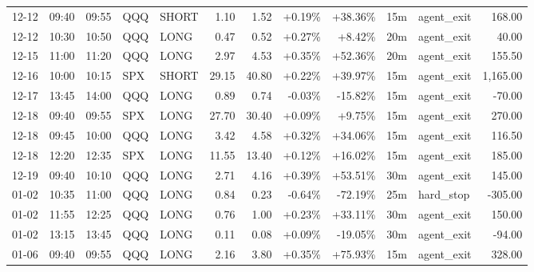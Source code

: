 \documentclass[11pt,a4paper]{article}
\begin{document}
\begin{center}
\begin{longtable}{>{\color{txtmain}}l l l l l r r r r r >{\color{txtmain}}l r}
12-12 & 09:40 & 09:55 & QQQ & SHORT & 1.10 & 1.52 & \textcolor{wingreen}{+0.19\%} & \textcolor{wingreen}{+38.36\%} & 15m & agent\_exit & \textcolor{wingreen}{168.00} \\
12-12 & 10:30 & 10:50 & QQQ & LONG & 0.47 & 0.52 & \textcolor{wingreen}{+0.27\%} & \textcolor{wingreen}{+8.42\%} & 20m & agent\_exit & \textcolor{wingreen}{40.00} \\
12-15 & 11:00 & 11:20 & QQQ & LONG & 2.97 & 4.53 & \textcolor{wingreen}{+0.35\%} & \textcolor{wingreen}{+52.36\%} & 20m & agent\_exit & \textcolor{wingreen}{155.50} \\
12-16 & 10:00 & 10:15 & SPX & SHORT & 29.15 & 40.80 & \textcolor{wingreen}{+0.22\%} & \textcolor{wingreen}{+39.97\%} & 15m & agent\_exit & \textcolor{wingreen}{1,165.00} \\
12-17 & 13:45 & 14:00 & QQQ & LONG & 0.89 & 0.74 & \textcolor{lossred}{-0.03\%} & \textcolor{lossred}{-15.82\%} & 15m & agent\_exit & \textcolor{lossred}{-70.00} \\
12-18 & 09:40 & 09:55 & SPX & LONG & 27.70 & 30.40 & \textcolor{wingreen}{+0.09\%} & \textcolor{wingreen}{+9.75\%} & 15m & agent\_exit & \textcolor{wingreen}{270.00} \\
12-18 & 09:45 & 10:00 & QQQ & LONG & 3.42 & 4.58 & \textcolor{wingreen}{+0.32\%} & \textcolor{wingreen}{+34.06\%} & 15m & agent\_exit & \textcolor{wingreen}{116.50} \\
12-18 & 12:20 & 12:35 & SPX & LONG & 11.55 & 13.40 & \textcolor{wingreen}{+0.12\%} & \textcolor{wingreen}{+16.02\%} & 15m & agent\_exit & \textcolor{wingreen}{185.00} \\
12-19 & 09:40 & 10:10 & QQQ & LONG & 2.71 & 4.16 & \textcolor{wingreen}{+0.39\%} & \textcolor{wingreen}{+53.51\%} & 30m & agent\_exit & \textcolor{wingreen}{145.00} \\
01-02 & 10:35 & 11:00 & QQQ & LONG & 0.84 & 0.23 & \textcolor{lossred}{-0.64\%} & \textcolor{lossred}{-72.19\%} & 25m & hard\_stop & \textcolor{lossred}{-305.00} \\
01-02 & 11:55 & 12:25 & QQQ & LONG & 0.76 & 1.00 & \textcolor{wingreen}{+0.23\%} & \textcolor{wingreen}{+33.11\%} & 30m & agent\_exit & \textcolor{wingreen}{150.00} \\
01-02 & 13:15 & 13:45 & QQQ & LONG & 0.11 & 0.08 & \textcolor{wingreen}{+0.09\%} & \textcolor{lossred}{-19.05\%} & 30m & agent\_exit & \textcolor{lossred}{-94.00} \\
01-06 & 09:40 & 09:55 & QQQ & LONG & 2.16 & 3.80 & \textcolor{wingreen}{+0.35\%} & \textcolor{wingreen}{+75.93\%} & 15m & agent\_exit & \textcolor{wingreen}{328.00} \\

\end{longtable}
\end{center}
\end{document}
